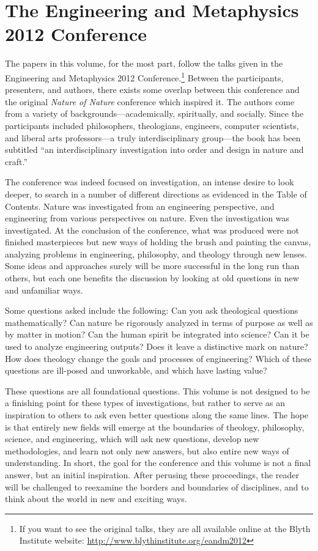 \section{The Engineering and Metaphysics 2012 Conference}

The papers in this volume, for the most part, follow the talks given in the Engineering and Metaphysics 2012 Conference.\footnote{If you want to see the original talks, they are all available online at the Blyth Institute website: \url{http://www.blythinstitute.org/eandm2012}}  Between the participants, presenters, and authors, there exists some overlap between this conference and the original \textit{Nature of Nature} conference which inspired it.  The authors come from a variety of backgrounds---academically, spiritually, and socially.  Since the participants included philosophers, theologians, engineers, computer scientists, and liberal arts professors---a truly interdisciplinary group---the book has been subtitled ``an interdisciplinary investigation into order and design in nature and craft.''  

The conference was indeed focused on investigation, an intense desire to look deeper, to search in a number of different directions as evidenced in the Table of Contents.  Nature was investigated from an engineering perspective, and engineering from various perspectives on nature.  Even the investigation was investigated.  At the conclusion of the conference, what
was produced were not finished masterpieces but new ways of holding the brush and painting the canvas, analyzing problems in engineering, philosophy, and theology through new lenses.  Some ideas and approaches surely will be more successful in the long run than others, but each one benefits the discussion by looking at old questions in new and unfamiliar ways.

Some questions asked include the following: Can you ask theological questions mathematically?  Can nature be rigorously analyzed in terms of purpose as well as by matter in motion?  Can the human spirit be integrated into science?  Can it be used to analyze engineering outputs?  Does it leave a distinctive mark on nature?  How does theology change the goals and processes of engineering?  Which of these questions are ill-posed and unworkable, and which have lasting value?

These questions are all foundational questions.  This volume is not designed to be a finishing point for these types of investigations, but rather to serve as an inspiration to others to ask even better questions along the same lines.  The hope is that entirely new fields will emerge at the boundaries of theology, philosophy, science, and engineering, which will ask new questions, develop new methodologies, and learn not only new answers, but also entire new ways of understanding.  In short, the goal for the conference and this volume is not a final answer, but an initial inspiration.  After perusing these proceedings, the reader will be challenged to reexamine the borders and boundaries of disciplines, and to think about the world in new and exciting ways.

